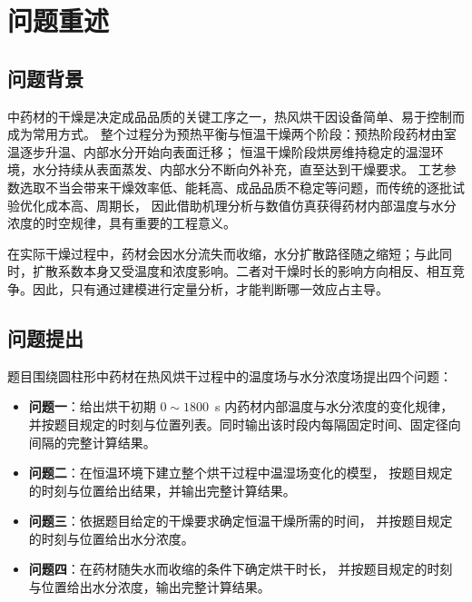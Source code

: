 \section{问题重述}

\subsection{问题背景}

中药材的干燥是决定成品品质的关键工序之一，热风烘干因设备简单、易于控制而成为常用方式。
整个过程分为预热平衡与恒温干燥两个阶段：预热阶段药材由室温逐步升温、内部水分开始向表面迁移；
恒温干燥阶段烘房维持稳定的温湿环境，水分持续从表面蒸发、内部水分不断向外补充，直至达到干燥要求。
工艺参数选取不当会带来干燥效率低、能耗高、成品品质不稳定等问题，而传统的逐批试验优化成本高、周期长，
因此借助机理分析与数值仿真获得药材内部温度与水分浓度的时空规律，具有重要的工程意义。

在实际干燥过程中，药材会因水分流失而收缩，水分扩散路径随之缩短；与此同时，扩散系数本身又受温度和浓度影响。二者对干燥时长的影响方向相反、相互竞争。因此，只有通过建模进行定量分析，才能判断哪一效应占主导。

\subsection{问题提出}

题目围绕圆柱形中药材在热风烘干过程中的温度场与水分浓度场提出四个问题：

\begin{itemize}[label=, leftmargin=2.4em, itemsep=3pt]
  \item \textbf{问题一}：给出烘干初期 $0\sim1800$~s 内药材内部温度与水分浓度的变化规律，
        并按题目规定的时刻与位置列表。同时输出该时段内每隔固定时间、固定径向间隔的完整计算结果。
  \item \textbf{问题二}：在恒温环境下建立整个烘干过程中温湿场变化的模型，
        按题目规定的时刻与位置给出结果，并输出完整计算结果。
  \item \textbf{问题三}：依据题目给定的干燥要求确定恒温干燥所需的时间，
        并按题目规定的时刻与位置给出水分浓度。
  \item \textbf{问题四}：在药材随失水而收缩的条件下确定烘干时长，
        并按题目规定的时刻与位置给出水分浓度，输出完整计算结果。
\end{itemize}
